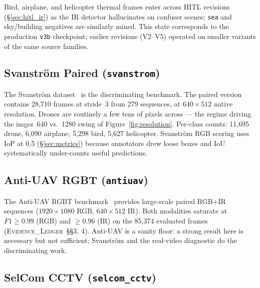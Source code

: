 Bird, airplane, and helicopter thermal frames enter across HITL revisions (\S\ref{sec:hitl_ir}) as the IR detector hallucinates on confuser scenes; \texttt{sea} and sky/building negatives are similarly mined. This state corresponds to the production \texttt{v3b} checkpoint; earlier revisions (V2--V5) operated on smaller variants of the same source families.

\subsection{Svanstr\"om Paired (\texttt{svanstrom})}
\label{sec:ds_svanstrom}

The Svanstr\"om dataset~\cite{svanstrom2021real,svanstrom2022dronedataset} is the discriminating benchmark. The paired version contains 28{,}710 frames at stride~3 from 279 sequences, at $640{\times}512$ native resolution. Drones are routinely a few tens of pixels across --- the regime driving the imgsz~640 vs.~1280 swing of Figure~\ref{fig:resolution}. Per-class counts: 11{,}695 drone, 6{,}090 airplane, 5{,}298 bird, 5{,}627 helicopter. Svanstr\"om RGB scoring uses IoP at 0.5 (\S\ref{sec:metrics}) because annotators drew loose boxes and IoU systematically under-counts useful predictions.

\subsection{Anti-UAV RGBT (\texttt{antiuav})}
\label{sec:ds_antiuav}

The Anti-UAV RGBT benchmark~\cite{jiang2021antiuav,zhao2023antiuav} provides large-scale paired RGB+IR sequences ($1920{\times}1080$ RGB, $640{\times}512$ IR). Both modalities saturate at $F1 \geq 0.99$ (RGB) and $\geq 0.96$ (IR) on the 85{,}374 evaluated frames (\textsc{Evidence\_Ledger}~\S\S3, 4). Anti-UAV is a sanity floor: a strong result here is necessary but not sufficient; Svanstr\"om and the real-video diagnostic do the discriminating work.

\subsection{SelCom CCTV (\texttt{selcom\_cctv})}
\label{sec:ds_selcom}


